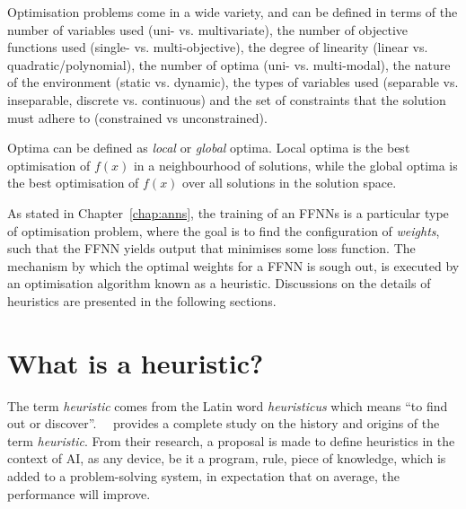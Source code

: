 \noindent
Optimisation problems come in a wide variety, and can be defined in terms of the number of variables used (uni- vs. multivariate), the number of objective functions used (single- vs. multi-objective), the degree of linearity (linear vs. quadratic/polynomial), the number of optima (uni- vs. multi-modal), the nature of the environment (static vs. dynamic), the types of variables used (separable vs. inseparable, discrete vs. continuous) and the set of constraints that the solution must adhere to (constrained vs unconstrained).

Optima can be defined as \textit{local} or \textit{global} optima. Local optima is the best optimisation of $f(x)$ in a neighbourhood of solutions, while the global optima is the best optimisation of $f(x)$ over all solutions in the solution space.

As stated in Chapter~\ref{chap:anns}, the training of an \acp{FFNN} is a particular type of optimisation problem, where the goal is to find the configuration of \textit{weights}, such that the \acs{FFNN} yields output that minimises some loss function. The mechanism by which the optimal weights for a \acs{FFNN} is sough out, is executed by an optimisation algorithm known as a heuristic. Discussions on the details of heuristics are presented in the following sections.

\section{What is a heuristic?}\label{sec:heuristics:what_is_a_heuristic}

The term \textit{heuristic} comes from the Latin word \textit{heuristicus} which means ``to find out or discover''.~\citeauthor{ref:romanycia:1985}~\cite{ref:romanycia:1985} provides a complete study on the history and origins of the term \textit{heuristic}. From their research, a proposal is made to define heuristics in the context of \acf{AI}, as any device, be it a program, rule, piece of knowledge, which is added to a problem-solving system, in expectation that on average, the performance will improve.

